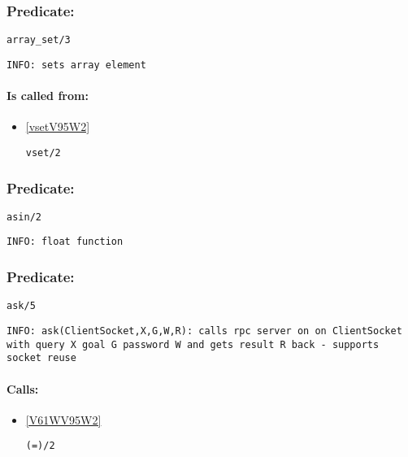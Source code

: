 \subsubsection{Predicate:} \label{arrayV95WsetV95W3}

\begin{verbatim}
array_set/3
\end{verbatim}

{\small \begin{verbatim}
INFO: sets array element

\end{verbatim}}
\paragraph{Is called from:} 
\begin{itemize}
\item \ref{vsetV95W2} 
\begin{verbatim}
vset/2
\end{verbatim}

\end{itemize}

\subsubsection{Predicate:} \label{asinV95W2}

\begin{verbatim}
asin/2
\end{verbatim}

{\small \begin{verbatim}
INFO: float function

\end{verbatim}}

\subsubsection{Predicate:} \label{askV95W5}

\begin{verbatim}
ask/5
\end{verbatim}

{\small \begin{verbatim}
INFO: ask(ClientSocket,X,G,W,R): calls rpc server on on ClientSocket with query X goal G password W and gets result R back - supports socket reuse

\end{verbatim}}
\paragraph{Calls:} 
\begin{itemize}
\item \ref{V61WV95W2} 
\begin{verbatim}
(=)/2
\end{verbatim}

\end{itemize}

